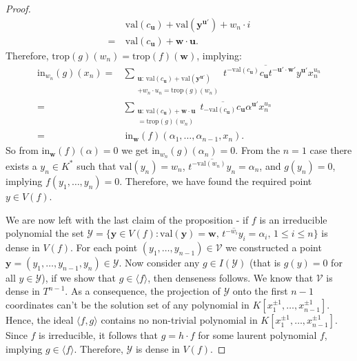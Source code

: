 \begin{proof}
\begin{align*}
            &~ \text{val}(c_{\textbf{u}}) + \text{val}(\textbf{y}^{\textbf{u}'}) + w_{n}\cdot i\\
            =& ~\text{val}(c_{\textbf{u}}) + \textbf{w} \cdot \textbf{u}.
        \end{align*}
        Therefore, $\text{trop}(g)(w_{n}) = \text{trop}(f)(\textbf{w})$, implying:
        \begin{align*}
            \text{in}_{w_{n}}(g)(x_{n}) =& \sum_{\substack{\textbf{u}:\, \text{val}(c_{\textbf{u}}) + \text{val}(\textbf{y}^{\textbf{u}'}) \\+ w_{n}\cdot u_{n} = \text{trop}(g)(w_{n})}} \overline{t^{-\text{val}(c_{\textbf{u}})}c_{\textbf{u}}t^{-\textbf{u}'\cdot \textbf{w}'}y^{\textbf{u}'}}x^{u_n}_{n} \\
            =& \sum_{\substack{\textbf{u}:\, \text{val}(c_{\textbf{u}}) + \textbf{w} \cdot \textbf{u} \\= \text{trop}(g)(w_{n})}}\overline{t_{-\text{val}(c_{\textbf{u}})}c_{\textbf{u}}}\alpha^{\textbf{u}'}x^{u_{n}}_{n}\\
            =& ~ \text{in}_{\textbf{w}}(f)(\alpha_{1}, \dots, \alpha_{n-1}, x_{n}).
        \end{align*}
        So from $\text{in}_{\textbf{w}}(f)(\alpha) = 0$ we get $\text{in}_{w_{n}}(g)(\alpha_{n}) = 0$.
        From the $n=1$ case there exists a $y_{n} \in K^{*}$ such that $\text{val}(y_n) = w_n$, $\overline{t^{-\text{val}(w_{n})}y_{n}} = \alpha_{n}$, and $g(y_{n}) = 0$, implying $f(y_1,\dots,y_n) = 0$.
        Therefore, we have found the required point $y \in V(f)$.
        \par We are now left with the last claim of the proposition - if $f$ is an irreducible polynomial the set $\mathcal{Y} = \{\textbf{y}\in V(f): \text{val}(\textbf{y}) = \textbf{w},\, \overline{t^{-w_{i}}y_{i}} = \alpha_{i},\, 1\leq i\leq n\}$ is dense in $V(f)$.
        For each point $(y_{1},\dots, y_{n-1}) \in \mathcal{V}$ we constructed a point $\textbf{y} = (y_{1},\dots, y_{n-1}, y_{n}) \in \mathcal{Y}$.
        Now consider any $g \in I(\mathcal{Y})$ (that is $g(y)= 0$ for all $y \in \mathcal{Y}$), if we show that $g\in \langle f \rangle$, then denseness follows.
        We know that $\mathcal{V}$ is dense in $T^{n-1}$.
        As a consequence, the projection of $\mathcal{Y}$ onto the first $n-1$ coordinates can't be the solution set of any polynomial in $ K[x_{1}^{\pm1}, \dots, x_{n-1}^{\pm1}]$.
        Hence, the ideal $\langle f,g \rangle$ contains no non-trivial polynomial in $ K[x_{1}^{\pm1}, \dots, x_{n-1}^{\pm1}]$.
        Since $f$ is irreducible, it follows that $g = h \cdot f$ for some laurent polynomial $f$, implying $g \in\langle f \rangle$.
        Therefore, $\mathcal{Y}$ is dense in $V(f)$.


    \end{proof}

